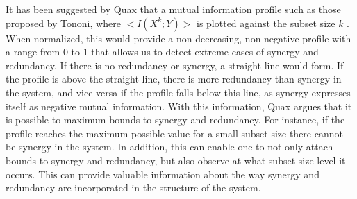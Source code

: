 \documentclass[../main.tex]{subfiles}
\begin{document}
It has been suggested by Quax that a mutual information profile such as those proposed by Tononi, where $< I(X^k;Y) >$ is plotted against the subset size $k$ \cite{QuaxPersonal, tononi1999measures}. 
When normalized, this would provide a non-decreasing, non-negative profile with a range from 0 to 1 that allows us to detect extreme cases of synergy and redundancy.
If there is no redundancy or synergy, a straight line would form.
If the profile is above the straight line, there is more redundancy than synergy in the system, and vice versa if the profile falls below this line, as synergy expresses itself as negative mutual information.
With this information, Quax argues that it is possible to maximum bounds to synergy and redundancy.
For instance, if the profile reaches the maximum possible value for a small subset size there cannot be synergy in the system.
In addition, this can enable one to not only attach bounds to synergy and redundancy, but also observe at what subset size-level it occurs.
This can provide valuable information about the way synergy and redundancy are incorporated in the structure of the system.

\end{document}
